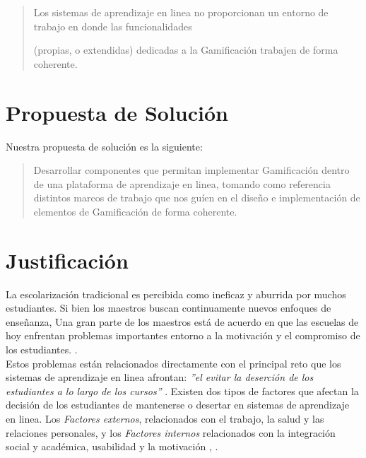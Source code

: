     \begin{quote}
    \colorbox{blue!05}{\parbox{\dimexpr\linewidth-2\fboxsep}{\strut
    Los sistemas de aprendizaje en linea
    no proporcionan un entorno de trabajo en donde las funcionalidades\par (propias, %
    o extendidas) dedicadas a la Gamificación trabajen de forma coherente\cite{coherencia}.
    \strut}}%
    \end{quote}

\section{Propuesta de Solución}
\label{sec:propuesta}

    Nuestra propuesta de solución es la siguiente:
    \begin{quote}
    \colorbox{blue!05}{\parbox{\dimexpr\linewidth-2\fboxsep}{\strut
        Desarrollar componentes que permitan implementar Gamificación dentro de una plataforma de aprendizaje en linea, tomando como referencia distintos marcos de trabajo que nos guíen en el diseño e implementación de elementos de Gamificación de forma coherente. 
    \strut}}
    \end{quote}

\clearpage
\section{Justificación}
\label{sec:justificacion}


    La escolarización tradicional es percibida como ineficaz y aburrida por muchos estudiantes. Si bien los maestros buscan continuamente nuevos enfoques de enseñanza, Una gran parte de los maestros está de acuerdo en que las escuelas de hoy enfrentan problemas importantes entorno a la motivación y el compromiso de los estudiantes. \cite{objetivo1}.\\

    \noindent Estos problemas están relacionados directamente con el principal reto que los sistemas de aprendizaje en linea afrontan: {\it''el evitar la deserción de los estudiantes a lo largo de los cursos''} \cite{objetivo1}. Existen dos tipos de factores que afectan la decisión de los estudiantes de mantenerse o desertar en sistemas de aprendizaje en linea. Los {\it Factores externos}, relacionados con el trabajo, la salud y las relaciones personales, y los {\it Factores internos} relacionados con la integración social y académica, usabilidad y la motivación \cite{problematica1}, \cite{dropoutOnline}.\\
    
